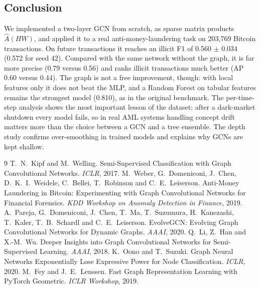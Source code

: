 \documentclass[11pt,a4paper]{article}
\newcommand{\Ahat}{\hat{A}}
\begin{document}
\subsection{Conclusion}
We implemented a two-layer GCN from scratch, as sparse matrix products $\Ahat(HW)$, and applied it to a real anti-money-laundering task
on 203,769 Bitcoin transactions. On future transactions it reaches an illicit F1 of 0.560 $\pm$ 0.034 (0.572 for seed 42). Compared with the
same network without the graph, it is far more precise (0.79 versus 0.56) and ranks illicit transactions much better (AP 0.60 versus 0.44).
The graph is not a free improvement, though: with local features only it does not beat the MLP, and a Random Forest on tabular
features remains the strongest model (0.810), as in the original benchmark. The per-time-step analysis shows the most important lesson of
the dataset: after a dark-market shutdown every model fails, so in real AML systems handling concept drift matters more than the choice
between a GCN and a tree ensemble. The depth study confirms over-smoothing in trained models and explains why GCNs are kept shallow.

\begin{thebibliography}{9}\small
{} T.~N.~Kipf and M.~Welling. Semi-Supervised Classification with Graph Convolutional Networks. \emph{ICLR}, 2017.
 M.~Weber, G.~Domeniconi, J.~Chen, D.~K.~I.~Weidele, C.~Bellei, T.~Robinson and C.~E.~Leiserson. Anti-Money Laundering in
Bitcoin: Experimenting with Graph Convolutional Networks for Financial Forensics. \emph{KDD Workshop on Anomaly Detection in Finance}, 2019.
 A.~Pareja, G.~Domeniconi, J.~Chen, T.~Ma, T.~Suzumura, H.~Kanezashi, T.~Kaler, T.~B.~Schardl and C.~E.~Leiserson.
EvolveGCN: Evolving Graph Convolutional Networks for Dynamic Graphs. \emph{AAAI}, 2020.
 Q.~Li, Z.~Han and X.-M.~Wu. Deeper Insights into Graph Convolutional Networks for Semi-Supervised Learning. \emph{AAAI}, 2018.
 K.~Oono and T.~Suzuki. Graph Neural Networks Exponentially Lose Expressive Power for Node Classification. \emph{ICLR}, 2020.
 M.~Fey and J.~E.~Lenssen. Fast Graph Representation Learning with PyTorch Geometric. \emph{ICLR Workshop}, 2019.
\end{thebibliography}
\end{document}
